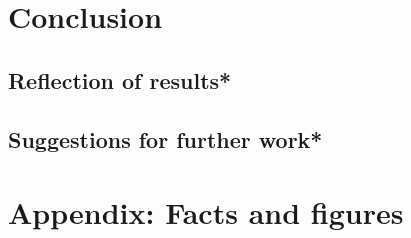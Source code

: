 \documentclass[10pt]{article}
\begin{document}
	\bigskip
	
\section{Conclusion}
	\subsection{Reflection of results*}

	\medskip

	\subsection{Suggestions for further work*}

\newpage
\printbibliography[
	    heading=bibintoc,
        title={References}
    ]
\newpage
\appendix

\section{Appendix: Facts and figures}
		
\end{document}
